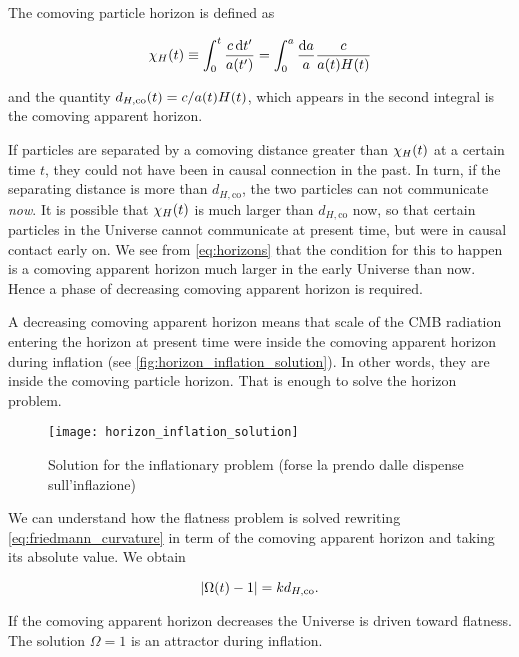 The comoving particle horizon is defined as

\begin{equation}
        \chi_H\qty(t) \equiv \int^t_0 \frac{c\dd{t'}}{a\qty(t')} =
        \int^a_0 \frac{\dd{a}}{a} \frac{c}{a\qty(t) H\qty(t)}
        \label{eq:horizons}
\end{equation}

and the quantity $d_{H,\text{co}}\qty(t) = c/a\qty(t)H\qty(t)$, which
appears in the second integral is the comoving apparent horizon.

If particles are separated by a comoving distance greater than
$\chi_H\qty(t)$ at a certain time $t$, they could not have been in causal
connection in the past. In turn, if the separating distance is more than
$d_{H,\text{co}}$, the two particles can not communicate \emph{now}. It is
possible that $\chi_H\qty(t)$ is much larger than $d_{H,\text{co}}$ now,
so that certain particles in the Universe cannot communicate at present
time, but were in causal contact early on. We see from \autoref{eq:horizons}
that the condition for this to happen is a comoving apparent horizon much larger
in the early Universe than now. Hence a phase of decreasing comoving
apparent horizon is required.

A decreasing comoving apparent horizon means that scale of the CMB
radiation entering the horizon at present time were inside the comoving
apparent horizon during inflation (see \autoref{fig:horizon_inflation_solution}).
In other words, they are inside the comoving particle horizon. That is
enough to solve the horizon problem.

\begin{figure}
        \centering
        \texttt{[image: horizon\_inflation\_solution]}
        \caption{Solution for the inflationary problem (forse la prendo
        dalle dispense sull'inflazione)}
        \label{fig:horizon_inflation_solution}
\end{figure}


We can understand how the flatness problem is solved rewriting
\autoref{eq:friedmann_curvature} in term of the comoving apparent horizon
and taking its absolute value.  We obtain

\begin{equation}
        \abs{\Omega\qty(t) - 1} = k d_{H,\text{co}}.
\end{equation}

If the comoving apparent horizon decreases the Universe is driven toward
flatness. The solution $\Omega = 1$ is an attractor during inflation.

